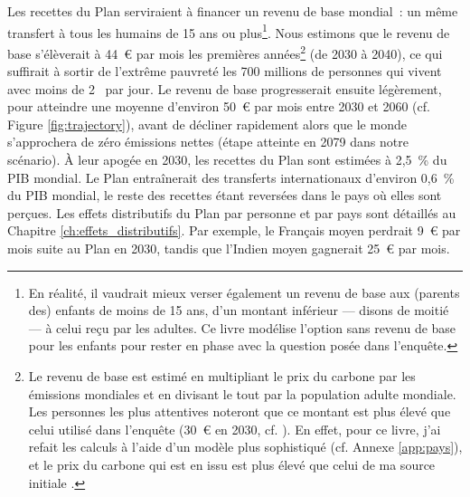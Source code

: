 \documentclass[a5paper,french,openany]{memoir}
\begin{document}
Les recettes du Plan serviraient à financer un revenu de base mondial~: un même transfert à tous les humains de 15 ans ou plus\footnote{En réalité, il vaudrait mieux verser également un revenu de base aux (parents des) enfants de moins de 15 ans, d'un montant inférieur --- disons de moitié --- à celui reçu par les adultes. Ce livre modélise l'option sans revenu de base pour les enfants pour rester en phase avec la question posée dans l'enquête.%
}. 
Nous estimons que le revenu de base s'élèverait à 44~\euro{} par mois les premières années\footnote{Le revenu de base est estimé en multipliant le prix du carbone par les émissions mondiales et en divisant le tout par la population adulte mondiale. Les personnes les plus attentives noteront que ce montant est plus élevé que celui utilisé dans l'enquête (30~\euro{} en 2030, cf. \citealp{fabre_global_2023}). En effet, pour ce livre, j'ai refait les calculs à l'aide d'un modèle plus sophistiqué (cf. Annexe \ref{app:pays}), et le prix du carbone qui est en issu est plus élevé que celui de ma source initiale \citep{stern_report_2017}.} 
(de 2030 à 2040), ce qui suffirait à sortir de l'extrême pauvreté les 700 millions de personnes qui vivent avec moins de 2~\textit{\texteuro{}} par jour. 
Le revenu de base progresserait ensuite légèrement, pour atteindre une moyenne d'environ 50~\euro{} par mois entre 2030 et 2060 (cf. Figure \ref{fig:trajectory}), avant de décliner rapidement alors que le monde s'approchera de zéro émissions nettes (étape atteinte en 2079 dans notre scénario). 
À leur apogée en 2030, les recettes du Plan sont estimées à 2,5~\% du PIB mondial. Le Plan entraînerait des transferts internationaux d'environ 0,6~\% %
du PIB mondial, le reste %
des recettes étant reversées dans le pays où elles sont perçues. 
Les effets distributifs du Plan par personne et par pays sont détaillés au Chapitre \ref{ch:effets_distributifs}. 
Par exemple, le Français moyen perdrait 9~\euro{} par mois suite au Plan en 2030, tandis que l'Indien moyen gagnerait 25~\euro{} par mois. %
\end{document}
